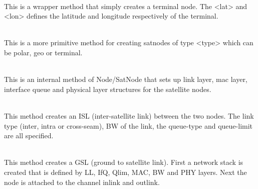 \begin{flushleft}
\\
This is a wrapper method that simply creates a terminal node. The <lat>
and <lon> defines the latitude and longitude respectively of the terminal.


\\
This is a more primitive method for creating satnodes of type <type>
which can be polar, geo or terminal. 


\\
This is an internal method of Node/SatNode that sets up link layer, mac
layer, interface queue and physical layer structures for the satellite
nodes.


\\
This method creates an ISL (inter-satellite link) between the two nodes.
The link type (inter, intra or cross-seam), BW of the link, the queue-type
and queue-limit are all specified.


\\
This method creates a GSL (ground to satellite link). First a network
stack is created that is defined by LL, IfQ, Qlim, MAC, BW and PHY layers.
Next the node is attached to the channel inlink and outlink.


\end{flushleft}

\endinput


